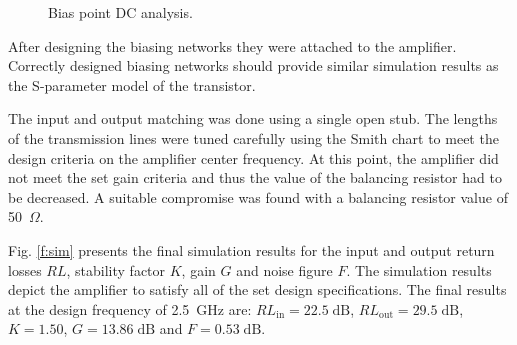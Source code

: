 \documentclass[a4paper, 12pt]{article}
\newcommand{\dB}{\ensuremath{\mathrm{dB}}}
\begin{document}
\begin{figure}[!h]
\centering
{}
\caption{Bias point DC analysis. 
\label{Sim_Bias_point}}
\end{figure}

After designing the biasing networks they were attached to the amplifier. 
Correctly designed biasing networks should provide similar simulation results 
as the S-parameter model of the transistor.

The input and output matching was done using a single open stub. The lengths 
of the transmission lines were tuned carefully using the Smith chart to meet 
the design criteria on the amplifier center frequency. At this point, the 
amplifier did not meet the set gain criteria and thus the value of the balancing 
resistor had to be decreased. A suitable compromise was found with a balancing 
resistor value of 50~$\Omega$. 

Fig. \ref{f:sim} presents the final simulation results for the input 
and output return losses $RL$, stability factor $K$, gain $G$ and noise figure 
$F$. The simulation results depict the amplifier to satisfy all of the set design 
specifications. The final results at the design frequency of 2.5~GHz are: 
$\textit{RL}_\mathrm{in} = 22.5 \;\dB$, $\textit{RL}_\mathrm{out} = 29.5 \;\dB$, 
$K = 1.50$, $G = 13.86 \;\dB$ and $F = 0.53 \;\dB$.
\end{document}
